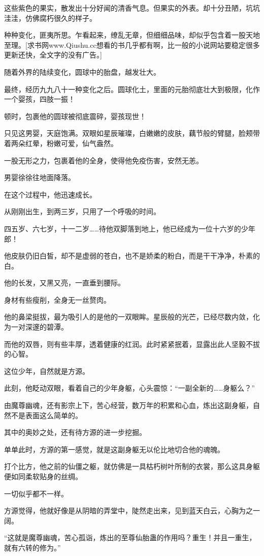 \begin{this_body}
这些紫色的果实，散发出十分好闻的清香气息。但果实的外表。却十分丑陋，坑坑洼洼，仿佛腐朽很久的样子。

种种变化，匪夷所思。乍看起来，缭乱无章，但细细品味，却似乎包含着一股天地至理。[求书网www.Qiushu.cc想看的书几乎都有啊，比一般的小说网站要稳定很多更新还快，全文字的没有广告。]

随着外界的陆续变化，圆球中的胎盘，越发壮大。

最终，经历九九八十一种变化之后。圆球化土，里面的元胎彻底壮大到极限，化作一个婴孩，四肢一振！

顿时，包裹他的圆球被彻底震碎，婴孩现世！

只见这男婴，天庭饱满。双眼如星辰璀璨，白嫩嫩的皮肤，藕节般的臂腿，脸颊带着两朵红晕，粉嫩可爱，仙气盎然。

一股无形之力，包裹着他的全身，使得他免疫伤害，安然无恙。

男婴徐徐往地面降落。

在这个过程中，他迅速成长。

从刚刚出生，到两三岁，只用了一个呼吸的时间。

四五岁、六七岁，十一二岁……待他双脚落到地上，他已经成为一位十六岁的少年郎！

他皮肤仍旧白皙，却不是虚弱的苍白，也不是娇柔的粉白，而是干干净净，朴素的白。

他的长发，又黑又亮，一直垂到腰际。

身材有些瘦削，全身无一丝赘肉。

他的鼻梁挺拔，最为吸引人的是他的一双眼眸。星辰般的光芒，已经尽数内敛，化为一对深邃的碧潭。

而他的双唇，则有些丰厚，透着健康的红润。此时紧紧抿着，显露出此人坚毅不拔的心智。

这位少年，自然就是方源。

此刻，他眨动双眼，看着自己的少年身躯，心头震惊：“一副全新的……身躯么？”

由魔尊幽魂，还有影宗上下，苦心经营，数万年的积累和心血，炼出这副身躯，自然不是表面这么简单的。

其中的奥妙之处，还有待方源的进一步挖掘。

单单此时，方源的第一感觉，就是这副身躯无以伦比地切合他的魂魄。

打个比方，他之前的仙僵之躯，就仿佛是一具枯朽树叶所制的衣裳，那么这具身躯便如同柔软贴身的丝绸。

一切似乎都不一样。

方源觉得，他就好像是从阴暗的弄堂中，陡然走出来，见到蓝天白云，心胸为之一阔。

“这就是魔尊幽魂，苦心孤诣，炼出的至尊仙胎蛊的作用吗？重生！并且一重生，就有六转的修为。”


\end{this_body}
